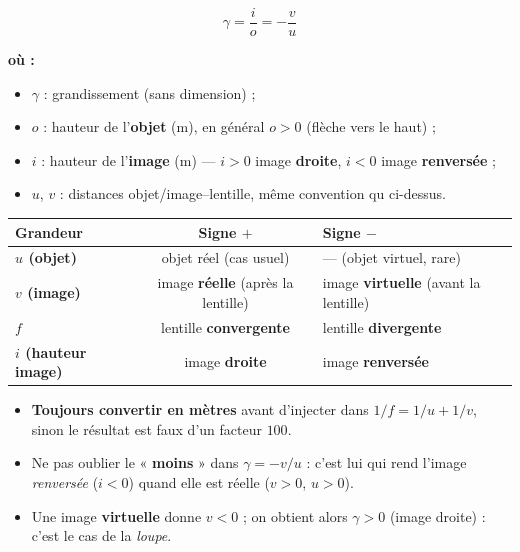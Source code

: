 \documentclass[11pt,a4paper]{article}
\newenvironment{ou}{%
  \par\smallskip\noindent\textbf{où :}\nopagebreak
  \begin{itemize}[leftmargin=1.8em,topsep=2pt,itemsep=1.5pt,parsep=0pt]}%
  {\end{itemize}}
\newcommand{\gamm}{\gamma}             %
\begin{document}
\begin{formule}[grandissement]
\[ \boxed{\;\gamm=\dfrac{i}{o}=-\dfrac{v}{u}\;} \]
\begin{ou}
  \item $\gamm$ : grandissement (sans dimension) ;
  \item $o$ : hauteur de l'\textbf{objet} (\si{\metre}), en général $o>0$ (flèche vers le haut) ;
  \item $i$ : hauteur de l'\textbf{image} (\si{\metre}) — $i>0$ image \textbf{droite}, $i<0$ image
        \textbf{renversée} ;
  \item $u$, $v$ : distances objet/image--lentille, même convention qu ci-dessus.
\end{ou}
\end{formule}

\begin{center}
\renewcommand{\arraystretch}{1.35}
\begin{tabular}{>{\bfseries}lcl}
\rowcolor{primary!18}
Grandeur & Signe $+$ & Signe $-$ \\
\midrule
$u$ (objet) & objet réel (cas usuel) & --- (objet virtuel, rare) \\
$v$ (image) & image \textbf{réelle} (après la lentille) & image \textbf{virtuelle} (avant la lentille) \\
$f$ & lentille \textbf{convergente} & lentille \textbf{divergente} \\
$i$ (hauteur image) & image \textbf{droite} & image \textbf{renversée} \\
\bottomrule
\end{tabular}
\end{center}

\begin{attention}
\begin{itemize}[leftmargin=1.7em,topsep=2pt,itemsep=1pt]
  \item \textbf{Toujours convertir en mètres} avant d'injecter dans $1/f=1/u+1/v$, sinon le résultat
        est faux d'un facteur $100$.
  \item Ne pas oublier le « \textbf{moins} » dans $\gamm=-v/u$ : c'est lui qui rend l'image
        \emph{renversée} ($i<0$) quand elle est réelle ($v>0$, $u>0$).
  \item Une image \textbf{virtuelle} donne $v<0$ ; on obtient alors $\gamm>0$ (image droite) :
        c'est le cas de la \emph{loupe}.
\end{itemize}
\end{attention}
\end{document}
